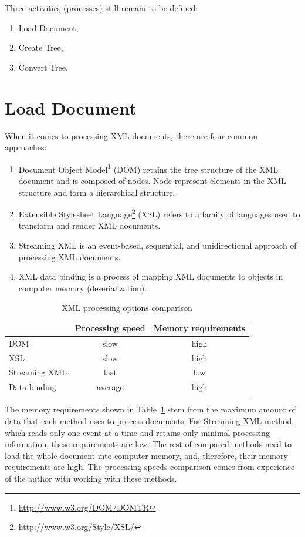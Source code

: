 \documentclass[11pt,oneside,final]{fithesis2}
\begin{document}
Three activities (processes) still remain to be defined:
\begin{enumerate}
\item Load Document,
\item Create Tree,
\item Convert Tree.
\end{enumerate}

\section{Load Document}
\label{section:loaddocument}
When it comes to processing XML documents, there are four common approaches:

\begin{enumerate}
\item Document Object Model\footnote{\url{http://www.w3.org/DOM/DOMTR}} (DOM) retains the tree structure of the XML document and is composed of nodes. Node represent elements in the XML structure and form a hierarchical structure.

\item Extensible Stylesheet Language\footnote{\url{http://www.w3.org/Style/XSL/}} (XSL) refers to a family of languages used to transform and render XML documents. 

\item Streaming XML is an event-based, sequential, and unidirectional approach of processing XML documents.

\item XML data binding is a process of mapping XML documents to objects in computer memory (deserialization).
\end{enumerate}

\begin{table}[!ht]
\centering
\begin{tabular}{|l|c|c|}
\hline
& Processing speed & Memory requirements \\ \hline
\hline
DOM & slow & high  \\ \hline
XSL & slow & high  \\ \hline
Streaming XML & fast & low  \\ \hline
Data binding & average & high  \\ \hline
\end{tabular}
\caption{XML processing options comparison}
\label{table:xmlprocessing}
\end{table}

The memory requirements shown in Table~\ref{table:xmlprocessing} stem from the maximum amount of data that each method uses to process documents. For Streaming XML method, which reads only one event at a time and retains only minimal processing information, these requirements are low. The rest of compared methods need to load the whole document into computer memory, and, therefore, their memory requirements are high. The processing speeds comparison comes from experience of the author with working with these methods.
\end{document}
